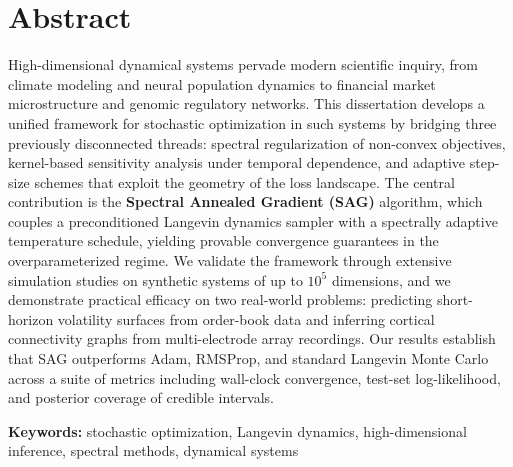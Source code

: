 \chapter*{Abstract}

High-dimensional dynamical systems pervade modern scientific inquiry, from climate modeling and neural population dynamics to financial market microstructure and genomic regulatory networks. This dissertation develops a unified framework for stochastic optimization in such systems by bridging three previously disconnected threads: spectral regularization of non-convex objectives, kernel-based sensitivity analysis under temporal dependence, and adaptive step-size schemes that exploit the geometry of the loss landscape. The central contribution is the \textbf{Spectral Annealed Gradient (SAG)} algorithm, which couples a preconditioned Langevin dynamics sampler with a spectrally adaptive temperature schedule, yielding provable convergence guarantees in the overparameterized regime. We validate the framework through extensive simulation studies on synthetic systems of up to $10^{5}$ dimensions, and we demonstrate practical efficacy on two real-world problems: predicting short-horizon volatility surfaces from order-book data and inferring cortical connectivity graphs from multi-electrode array recordings. Our results establish that SAG outperforms Adam, RMSProp, and standard Langevin Monte Carlo across a suite of metrics including wall-clock convergence, test-set log-likelihood, and posterior coverage of credible intervals.

\vspace{8pt}
\noindent\textbf{Keywords:} stochastic optimization, Langevin dynamics, high-dimensional inference, spectral methods, dynamical systems

\clearpage

\tableofcontents
\clearpage

\listoffigures
{}
\clearpage

\listoftables
{}
\clearpage

